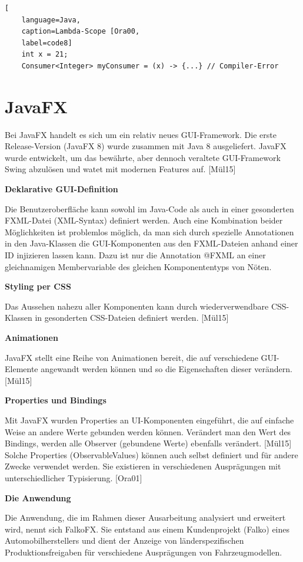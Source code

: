 \begin{lstlisting}[
    language=Java,
    caption=Lambda-Scope [Ora00,
    label=code8]
	int x = 21;
	Consumer<Integer> myConsumer = (x) -> {...} // Compiler-Error
\end{lstlisting}

\section{JavaFX} \label{sec:grundJavaFX}
Bei JavaFX handelt es sich um ein relativ neues GUI-Framework. Die erste Release-Version (JavaFX 8) wurde zusammen mit Java 8 ausgeliefert. JavaFX wurde entwickelt, um das bewährte, aber dennoch veraltete GUI-Framework Swing abzulösen und watet mit modernen Features auf. [Mül15]

\textbf{Deklarative GUI-Definition}

Die Benutzeroberfläche kann sowohl im Java-Code als auch in einer gesonderten FXML-Datei (XML-Syntax) definiert werden. Auch eine Kombination beider Möglichkeiten ist problemlos möglich, da man sich durch spezielle Annotationen in den Java-Klassen die GUI-Komponenten aus den FXML-Dateien anhand einer ID injizieren lassen kann. Dazu ist nur die Annotation @FXML an einer gleichnamigen Membervariable des gleichen Komponententyps von Nöten.

\textbf{Styling per CSS}

Das Aussehen nahezu aller Komponenten kann durch wiederverwendbare CSS-Klassen in gesonderten CSS-Dateien definiert werden. [Mül15]

\textbf{Animationen}

JavaFX stellt eine Reihe von Animationen bereit, die auf verschiedene GUI-Elemente angewandt werden können und so die Eigenschaften dieser verändern. [Mül15]

\textbf{Properties und Bindings}

Mit JavaFX wurden Properties an UI-Komponenten eingeführt, die auf einfache Weise an andere Werte gebunden werden können. Verändert man den Wert des Bindings, werden alle Observer (gebundene Werte) ebenfalls verändert. [Mül15] Solche Properties (ObservableValues) können auch selbst definiert und für andere Zwecke verwendet werden. Sie existieren in verschiedenen Ausprägungen mit unterschiedlicher Typisierung. [Ora01]

\textbf{Die Anwendung}

Die Anwendung, die im Rahmen dieser Ausarbeitung analysiert und erweitert wird, nennt sich FalkoFX. Sie entstand aus einem Kundenprojekt (Falko) eines Automobilherstellers und dient der Anzeige von länderspezifischen Produktionsfreigaben für verschiedene Ausprägungen von Fahrzeugmodellen.

